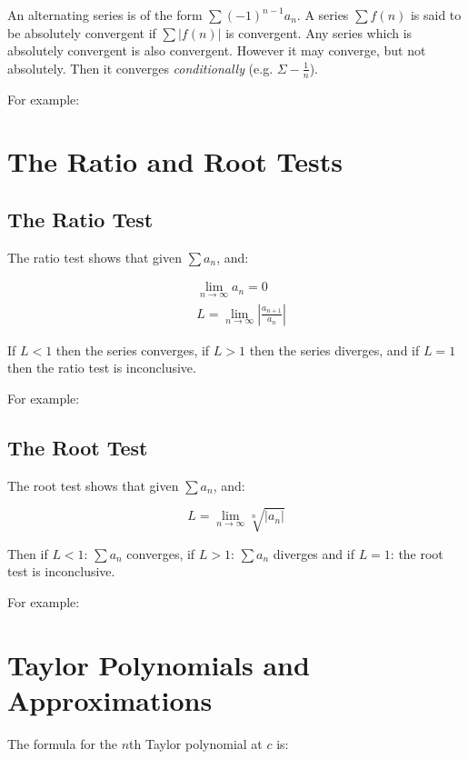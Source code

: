 \documentclass{article}
\newenvironment{correction}
{\color{green}}
{}
\let\oldsqrt\sqrt
\def\sqrt{\mathpalette\DHLhksqrt}
\def\DHLhksqrt#1#2{%
\setbox0=\hbox{$#1\oldsqrt{#2\,}$}\dimen0=\ht0
\advance\dimen0-0.2\ht0
\setbox2=\hbox{\vrule height\ht0 depth -\dimen0}%
{\box0\lower0.4pt\box2}}
\begin{document}
An alternating series is of the form $\sum (-1)^{n-1}a_n$.  A series
$\sum f(n)$ is said to be absolutely convergent if $\sum \left|
  f(n) \right|$ is convergent.  Any series which is absolutely
convergent is also convergent. \begin{correction} However it may converge, but not absolutely. Then it converges \emph{conditionally} (e.g. $\Sigma-\frac{1}{n}$).\end{correction}

For example:



\section{The Ratio and Root Tests}

\subsection{The Ratio Test}

The ratio test shows that given $\sum a_n$, and:

\begin{align*}
  &\lim_{n \to \infty} a_n = 0 \\
  &L = \lim_{n \to \infty} \left| \frac{a_{n+1}}{a_n} \right|
\end{align*}

If $L<1$ then the series converges, if $L>1$ then the series diverges,
and if $L=1$ then the ratio test is inconclusive.

For example:

\subsection{The Root Test}

The root test shows that given $\sum a_n$, and:

\[
L = \lim_{n \to \infty} \oldsqrt[n]{\left| a_n \right|}
\]

Then if $L < 1$: $\sum a_n$ converges, if $L > 1$: $\sum a_n$
diverges and if $L = 1$: the root test is inconclusive.

For example:

\section{Taylor Polynomials and Approximations}

The formula for the $n$th Taylor polynomial at $c$ is:
\end{document}
